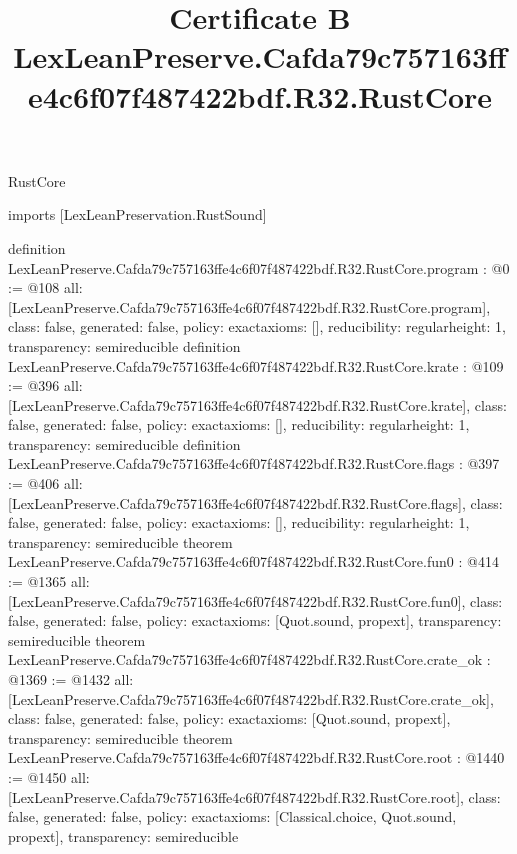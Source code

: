 \begin{lexlean}{RustCore}
\title{Certificate B LexLeanPreserve.Cafda79c757163ffe4c6f07f487422bdf.R32.RustCore}
\begin{coremodule}
imports [LexLeanPreservation.RustSound]

definition LexLeanPreserve.Cafda79c757163ffe4c6f07f487422bdf.R32.RustCore.program : @0 := @108 {
  all: [LexLeanPreserve.Cafda79c757163ffe4c6f07f487422bdf.R32.RustCore.program],
  class: false,
  generated: false,
  policy: exact{axioms: []},
  reducibility: regular{height: 1},
  transparency: semireducible
}
definition LexLeanPreserve.Cafda79c757163ffe4c6f07f487422bdf.R32.RustCore.krate : @109 := @396 {
  all: [LexLeanPreserve.Cafda79c757163ffe4c6f07f487422bdf.R32.RustCore.krate],
  class: false,
  generated: false,
  policy: exact{axioms: []},
  reducibility: regular{height: 1},
  transparency: semireducible
}
definition LexLeanPreserve.Cafda79c757163ffe4c6f07f487422bdf.R32.RustCore.flags : @397 := @406 {
  all: [LexLeanPreserve.Cafda79c757163ffe4c6f07f487422bdf.R32.RustCore.flags],
  class: false,
  generated: false,
  policy: exact{axioms: []},
  reducibility: regular{height: 1},
  transparency: semireducible
}
theorem LexLeanPreserve.Cafda79c757163ffe4c6f07f487422bdf.R32.RustCore.fun0 : @414 := @1365 {
  all: [LexLeanPreserve.Cafda79c757163ffe4c6f07f487422bdf.R32.RustCore.fun0],
  class: false,
  generated: false,
  policy: exact{axioms: [Quot.sound, propext]},
  transparency: semireducible
}
theorem LexLeanPreserve.Cafda79c757163ffe4c6f07f487422bdf.R32.RustCore.crate_ok : @1369 := @1432 {
  all: [LexLeanPreserve.Cafda79c757163ffe4c6f07f487422bdf.R32.RustCore.crate_ok],
  class: false,
  generated: false,
  policy: exact{axioms: [Quot.sound, propext]},
  transparency: semireducible
}
theorem LexLeanPreserve.Cafda79c757163ffe4c6f07f487422bdf.R32.RustCore.root : @1440 := @1450 {
  all: [LexLeanPreserve.Cafda79c757163ffe4c6f07f487422bdf.R32.RustCore.root],
  class: false,
  generated: false,
  policy: exact{axioms: [Classical.choice, Quot.sound, propext]},
  transparency: semireducible
}


\end{coremodule}
\end{lexlean}
